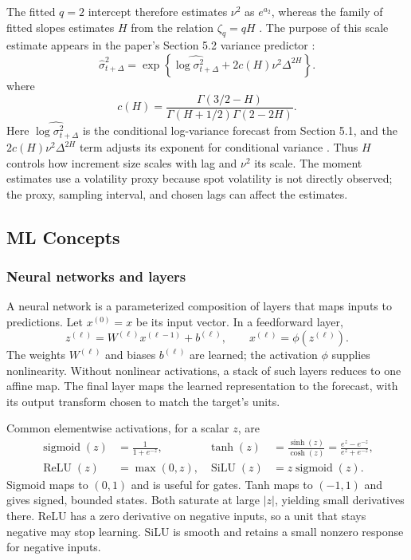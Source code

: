 \documentclass[12pt,a4paper]{article}
\numberwithin{equation}{section}
\numberwithin{table}{section}
\numberwithin{figure}{section}
\begin{document}
The fitted $q=2$ intercept therefore estimates $\nu^2$ as $e^{a_2}$, whereas the family of fitted slopes estimates $H$ from the relation $\zeta_q=qH$ \cite{gatheral2018}.
The purpose of this scale estimate appears in the paper's Section 5.2 variance predictor \cite{gatheral2018}:
\begin{equation}\label{eq:rfsv-variance-predictor}
\widehat{\sigma}^{2}_{t+\Delta}
=\exp\!\left\{\widehat{\log\sigma^2_{t+\Delta}}
+2c(H)\nu^2\Delta^{2H}\right\}.
\end{equation}
where
\begin{equation}\label{eq:rfsv-c-h}
c(H)=\frac{\Gamma(3/2-H)}{\Gamma(H+1/2)\Gamma(2-2H)}.
\end{equation}
Here $\widehat{\log\sigma^2_{t+\Delta}}$ is the conditional log-variance forecast from Section 5.1, and the $2c(H)\nu^2\Delta^{2H}$ term adjusts its exponent for conditional variance \cite{gatheral2018}. Thus $H$ controls how increment size scales with lag and $\nu^2$ its scale. The moment estimates use a volatility proxy because spot volatility is not directly observed; the proxy, sampling interval, and chosen lags can affect the estimates. 

\subsection{ML Concepts}
\subsubsection{Neural networks and layers}
A neural network is a parameterized composition of layers that maps inputs to predictions. Let $x^{(0)}=x$ be its input vector. In a feedforward layer,
\begin{equation}\label{eq:neural-layer}
z^{(\ell)}=W^{(\ell)}x^{(\ell-1)}+b^{(\ell)},\qquad
x^{(\ell)}=\phi\!\left(z^{(\ell)}\right).
\end{equation}
The weights $W^{(\ell)}$ and biases $b^{(\ell)}$ are learned; the activation $\phi$ supplies nonlinearity. Without nonlinear activations, a stack of such layers reduces to one affine map. The final layer maps the learned representation to the forecast, with its output transform chosen to match the target's units.

Common elementwise activations, for a scalar $z$, are
\begin{equation}\label{eq:activations}
\begin{aligned}
\operatorname{sigmoid}(z)&=\frac{1}{1+e^{-z}}, &
\tanh(z)&=\frac{\sinh(z)}{\cosh(z)}=\frac{e^z-e^{-z}}{e^z+e^{-z}},\\
\operatorname{ReLU}(z)&=\max(0,z), &
\operatorname{SiLU}(z)&=z\operatorname{sigmoid}(z).
\end{aligned}
\end{equation}
Sigmoid maps to $(0,1)$ and is useful for gates. Tanh maps to $(-1,1)$ and gives signed, bounded states. Both saturate at large $|z|$, yielding small derivatives there. ReLU has a zero derivative on negative inputs, so a unit that stays negative may stop learning. SiLU is smooth and retains a small nonzero response for negative inputs.
\end{document}
